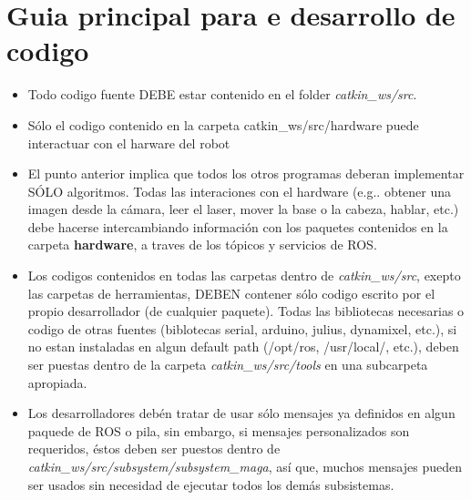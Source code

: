 \documentclass[a4paper]{book}
\begin{document}
\section{Guia principal para e desarrollo de codigo}
\begin{itemize}
 \item Todo codigo fuente DEBE estar contenido en el folder \textit{catkin\_ws/src}.\\
 
 \item Sólo el codigo contenido en la carpeta catkin\_ws/src/hardware puede interactuar con el 
 harware del robot\\
 
 \item El punto anterior implica que todos los otros programas deberan implementar SÓLO algoritmos. 
 Todas las interaciones con el hardware (e.g.. obtener una imagen desde la cámara, leer el laser, 
 mover la base o la cabeza, hablar, etc.) debe hacerse intercambiando información con los paquetes
 contenidos en la carpeta \textbf{hardware}, a traves de los tópicos y servicios de ROS.
 
 \item Los codigos contenidos en todas las carpetas dentro de \textit{catkin\_ws/src}, exepto las carpetas de 
 herramientas, DEBEN contener sólo codigo escrito por el propio desarrollador (de cualquier paquete).
 Todas las bibliotecas necesarias o codigo de otras fuentes (biblotecas serial, arduino, julius,
 dynamixel, etc.), si no estan instaladas en algun default path (/opt/ros, /usr/local/, etc.), deben 
 ser puestas dentro de la carpeta \textit{catkin\_ws/src/tools} en una subcarpeta apropiada.\\
 
 \item Los desarrolladores debén tratar de usar sólo mensajes ya definidos en algun paquede de ROS o
 pila, sin embargo, si mensajes personalizados son requeridos, éstos deben ser puestos dentro de
 \textit{catkin\_ws/src/subsystem/subsystem\_maga}, así que, muchos mensajes pueden ser usados sin necesidad
 de ejecutar todos los demás subsistemas.\\
\end{itemize}
\end{document}
